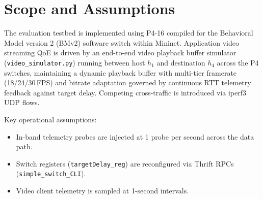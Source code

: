 \documentclass[12pt,a4paper,oneside]{report}
\begin{document}
\section{Scope and Assumptions}
The evaluation testbed is implemented using P4-16 compiled for the Behavioral Model version 2 (BMv2) software switch within Mininet. Application video streaming QoE is driven by an end-to-end video playback buffer simulator (\texttt{video\_simulator.py}) running between host $h_1$ and destination $h_4$ across the P4 switches, maintaining a dynamic playback buffer with multi-tier framerate (18/24/30\,FPS) and bitrate adaptation governed by continuous RTT telemetry feedback against target delay. Competing cross-traffic is introduced via iperf3 UDP flows.

Key operational assumptions:
\begin{itemize}
  \item In-band telemetry probes are injected at 1 probe per second across the data path.
  \item Switch registers (\texttt{targetDelay\_reg}) are reconfigured via Thrift RPCs (\texttt{simple\_switch\_CLI}).
  \item Video client telemetry is sampled at 1-second intervals.
\end{itemize}
\end{document}

